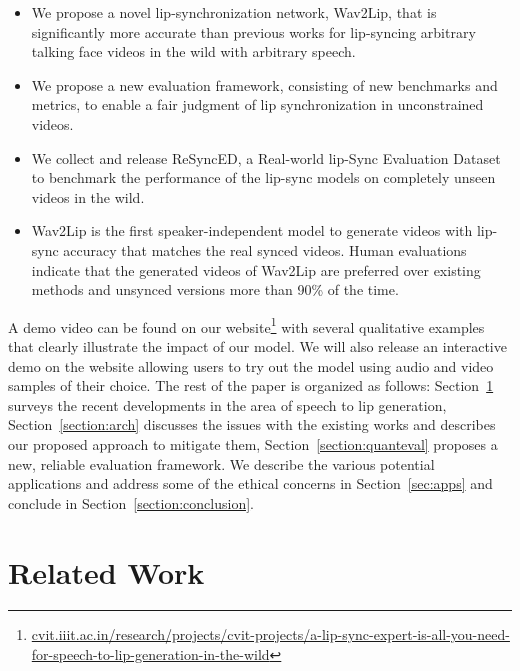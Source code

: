 \documentclass[sigconf]{acmart}
\begin{document}
\begin{itemize}
    \item We propose a novel lip-synchronization network, Wav2Lip, that is significantly more accurate than previous works for lip-syncing arbitrary talking face videos in the wild with arbitrary speech.
    \item We propose a new evaluation framework, consisting of new benchmarks and metrics, to enable a fair judgment of lip synchronization in unconstrained videos.
    \item We collect and release ReSyncED, a Real-world lip-Sync Evaluation Dataset to benchmark the performance of the lip-sync models on completely unseen videos in the wild. 
    \item Wav2Lip is the first speaker-independent model to generate videos with lip-sync accuracy that matches the real synced videos. Human evaluations indicate that the generated videos of Wav2Lip are preferred over existing methods and unsynced versions more than 90\% of the time. 
\end{itemize}

A demo video can be found on our website\footnote{\url{cvit.iiit.ac.in/research/projects/cvit-projects/a-lip-sync-expert-is-all-you-need-for-speech-to-lip-generation-in-the-wild}} with several qualitative examples that clearly illustrate the impact of our model. We will also release an interactive demo on the website allowing users to try out the model using audio and video samples of their choice. The rest of the paper is organized as follows: Section~\ref{section:related} surveys the recent developments in the area of speech to lip generation, Section~\ref{section:arch} discusses the issues with the existing works and describes our proposed approach to mitigate them, Section~\ref{section:quanteval} proposes a new, reliable evaluation framework. We describe the various potential applications and address some of the ethical concerns in Section~\ref{sec:apps} and conclude in Section~\ref{section:conclusion}.

\section{Related Work}
\label{section:related}
\end{document}
